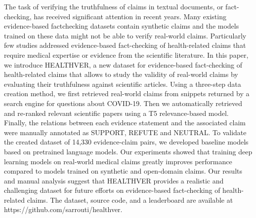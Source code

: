 The task of verifying the truthfulness of claims in textual documents, or fact-checking, has received significant attention in recent years. Many existing evidence-based factchecking datasets contain synthetic claims and the models trained on these data might not be able to verify real-world claims. Particularly few studies addressed evidence-based fact-checking of health-related claims that require medical expertise or evidence from the scientific literature. In this paper, we introduce HEALTHVER, a new dataset for evidence-based fact-checking of health-related claims that allows to study the validity of real-world claims by evaluating their truthfulness against scientific articles. Using a three-step data creation method, we first retrieved real-world claims from snippets returned by a search engine for questions about COVID-19. Then we automatically retrieved and re-ranked relevant scientific papers using a T5 relevance-based model. Finally, the relations between each evidence statement and the associated claim were manually annotated as SUPPORT, REFUTE and NEUTRAL. To validate the created dataset of 14,330 evidence-claim pairs, we developed baseline models based on pretrained language models. Our experiments showed that training deep learning models on real-world medical claims greatly improves performance compared to models trained on synthetic and open-domain claims. Our results and manual analysis suggest that HEALTHVER provides a realistic and challenging dataset for future efforts on evidence-based fact-checking of health-related claims. The dataset, source code, and a leaderboard are available at https://github.com/sarrouti/healthver.
